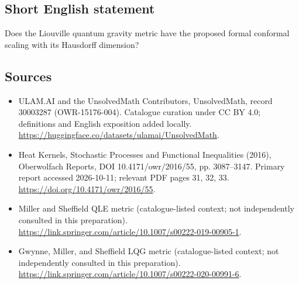 \documentclass[11pt]{article}
\begin{document}
\subsection{Short English statement}
Does the Liouville quantum gravity metric have the proposed formal conformal scaling with its Hausdorff dimension?
\subsection{Sources}
\begin{itemize}
\item[\hypertarget{source:30003287:1}{S1}] ULAM.AI and the UnsolvedMath Contributors, UnsolvedMath, record 30003287 (OWR-15176-004). Catalogue curation under CC BY 4.0; definitions and English exposition added locally.
\url{https://huggingface.co/datasets/ulamai/UnsolvedMath}.
\item[\hypertarget{source:30003287:2}{S2}] Heat Kernels, Stochastic Processes and Functional Inequalities (2016), Oberwolfach Reports, DOI 10.4171/owr/2016/55, pp. 3087--3147. Primary report accessed 2026-10-11; relevant PDF pages 31, 32, 33.
\url{https://doi.org/10.4171/owr/2016/55}.
\item[\hypertarget{source:30003287:3}{S3}] Miller and Sheffield QLE metric (catalogue-listed context; not independently consulted in this preparation).
\url{https://link.springer.com/article/10.1007/s00222-019-00905-1}.
\item[\hypertarget{source:30003287:4}{S4}] Gwynne, Miller, and Sheffield LQG metric (catalogue-listed context; not independently consulted in this preparation).
\url{https://link.springer.com/article/10.1007/s00222-020-00991-6}.
\end{itemize}
\label{end:30003287}
\end{document}

